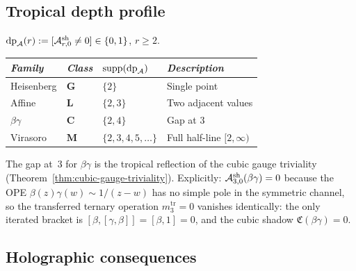 \subsection{Tropical depth profile}

\begin{definition}
$\mathrm{dp}_{\mathcal{A}}(r) := [\mathcal{A}^{\mathrm{sh}}_{r,0} \neq 0]
\in \{0,1\}$, $r \geq 2$.
\end{definition}

\begin{proposition}
\ClaimStatusProvedHere
\begin{center}
\small
\renewcommand{\arraystretch}{1.15}
\begin{tabular}{llll}
\toprule
\emph{Family} & \emph{Class} &
 $\mathrm{supp}(\mathrm{dp}_{\mathcal{A}})$ &
 \emph{Description} \\
\midrule
Heisenberg & $\mathbf{G}$ & $\{2\}$ &
 Single point \\
Affine & $\mathbf{L}$ & $\{2, 3\}$ &
 Two adjacent values \\
$\beta\gamma$ & $\mathbf{C}$ & $\{2, 4\}$ &
 Gap at $3$ \\
Virasoro & $\mathbf{M}$ & $\{2, 3, 4, 5, \ldots\}$ &
 Full half-line $[2, \infty)$ \\
\bottomrule
\end{tabular}
\end{center}
The gap at~$3$ for $\beta\gamma$ is the tropical reflection of
the cubic gauge triviality
\textup{(}Theorem~\ref{thm:cubic-gauge-triviality}\textup{)}.
Explicitly: $\mathcal{A}^{\mathrm{sh}}_{3,0}(\beta\gamma) = 0$ because
the OPE $\beta(z)\gamma(w) \sim 1/(z-w)$ has no simple pole
in the symmetric channel, so the transferred ternary operation
$m_3^{\mathrm{tr}} = 0$ vanishes identically: the only iterated
bracket is $[\beta, [\gamma, \beta]] = [\beta, 1] = 0$, and
the cubic shadow $\mathfrak{C}(\beta\gamma) = 0$.
\end{proposition}



\subsection{Holographic consequences}

